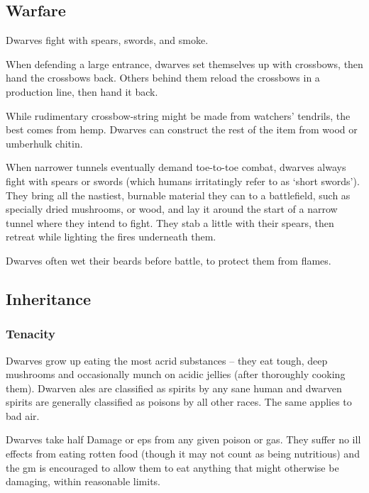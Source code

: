 \begin{multicols}{2}
\subsection{Warfare}

Dwarves fight with spears, swords, and smoke.

When defending a large entrance, dwarves set themselves up with crossbows, then hand the crossbows back.
Others behind them reload the crossbows in a production line, then hand it back.

While rudimentary crossbow-string might be made from watchers' tendrils, the best comes from hemp.
Dwarves can construct the rest of the item from wood or umberhulk chitin.

When narrower tunnels eventually demand toe-to-toe combat, dwarves always fight with spears or swords (which humans irritatingly refer to as `short swords').
They bring all the nastiest, burnable material they can to a battlefield, such as specially dried mushrooms, or wood, and lay it around the start of a narrow tunnel where they intend to fight.
They stab a little with their spears, then retreat while lighting the fires underneath them.

Dwarves often wet their beards before battle, to protect them from flames.

\subsection{Inheritance}

\subsubsection[Tenacity: dwarves take only half the usual penalties from rotten food, poisons, or foul air.]{Tenacity}
\label{dwarvenInheritance}

Dwarves grow up eating the most acrid substances -- they eat tough, deep mushrooms and occasionally munch on acidic jellies (after thoroughly cooking them).
Dwarven ales are classified as spirits by any sane human and dwarven spirits are generally classified as poisons by all other races.
The same applies to bad air.

Dwarves take half Damage or \glspl{ep} from any given poison or gas.
They suffer no ill effects from eating rotten food (though it may not count as being nutritious) and the \gls{gm} is encouraged to allow them to eat anything that might otherwise be damaging, within reasonable limits.


\end{multicols}

